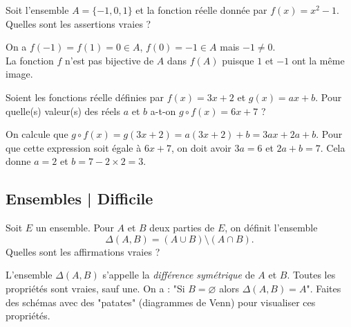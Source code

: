 \begin{question}
Soit l'ensemble $A = \{ -1 , 0 , 1 \}$ et la fonction réelle donnée par $f(x) = x^2-1$. Quelles sont les assertions vraies ?
\begin{answers} 
\end{answers}
\begin{explanations} 
On a $f(-1) = f(1) = 0 \in A$, $f(0) = -1 \in A$ mais $-1 \neq 0$.\\
La fonction $f$ n'est pas bijective de $A$ dans $f(A)$ puisque $1$ et $-1$ ont la même image.
\end{explanations}
\end{question}


\begin{question}
Soient les fonctions réelle définies par $f(x) = 3x+2$ et $g(x) = ax + b$. Pour quelle(s) valeur(s) des réels $a$ et $b$ a-t-on $g \circ f (x) = 6x + 7$ ?
\begin{answers} 
\end{answers}
\begin{explanations} 
On calcule que $g \circ f (x) = g(3x+2) = a(3x+2) + b = 3a x + 2a + b$. Pour que cette expression soit égale à $6x+7$, on doit avoir $3a = 6$ et $2a+b=7$. Cela donne $a=2$ et $b=7- 2 \times 2 = 3$.
\end{explanations}
\end{question}


\subsection{Ensembles | Difficile}

\begin{question}
Soit $E$ un ensemble. Pour $A$ et $B$ deux parties de $E$, on définit l'ensemble
$$\Delta(A,B) = (A \cup B) \setminus (A \cap B).$$
Quelles sont les affirmations vraies ?
\begin{answers}
\end{answers}
\begin{explanations} 
L'ensemble $\Delta(A,B)$ s'appelle la \emph{différence symétrique} de $A$ et $B$.
Toutes les propriétés sont vraies, sauf une. On a : "Si $B = \varnothing$ alors $\Delta(A,B) = A$".
Faites des schémas avec des "patates" (diagrammes de Venn) pour visualiser ces propriétés.
\end{explanations}
\end{question}


